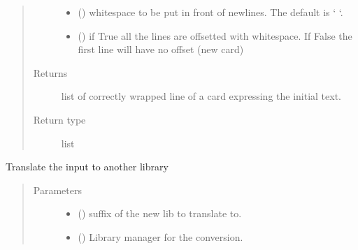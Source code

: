\documentclass[letterpaper,10pt,english]{sphinxmanual}
\begin{document}
\begin{fulllineitems}
\begin{fulllineitems}
\begin{quote}
\begin{description}
\begin{itemize}
\item {} 
 (\sphinxstyleliteralemphasis{\sphinxupquote{, }}) \textendash{} whitespace to be put in front of newlines. The default is ‘      ‘.

\item {} 
 (\sphinxstyleliteralemphasis{\sphinxupquote{, }}) \textendash{} if True all the lines are off\sphinxhyphen{}setted with whitespace. If False
the first line will have no offset (new card)

\end{itemize}

\item[{Returns}] \leavevmode
list of correctly wrapped line of a card expressing the initial
text.

\item[{Return type}] \leavevmode
list

\end{description}\end{quote}

\end{fulllineitems}


\begin{fulllineitems}
\label{\detokenize{api/inputgeneration:inputfile.InputFile.translate}}
Translate the input to another library
\begin{quote}\begin{description}
\item[{Parameters}] \leavevmode\begin{itemize}
\item {} 
 () \textendash{} suffix of the new lib to translate to.

\item {} 
 ({\hyperref[\detokenize{api/initobjects:libmanager.LibManager}]{}}) \textendash{} Library manager for the conversion.


\end{itemize}
\end{description}
\end{quote}
\end{fulllineitems}
\end{fulllineitems}
\end{document}
